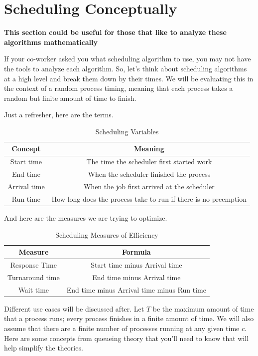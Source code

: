 \section{Scheduling Conceptually}\label{sec:scheduling_conceptually}

\textbf{This section could be useful for those that like to analyze these algorithms mathematically}

If your co-worker asked you what scheduling algorithm to use, you may not have the tools to analyze each algorithm.
So, let's think about scheduling algorithms at a high level and break them down by their times.
We will be evaluating this in the context of a random process timing, meaning that each process takes a random but finite amount of time to finish.

Just a refresher, here are the terms.

\begin{table}[h]
  \centering
\caption{Scheduling Variables}
\begin{tabular}{|c|c|}
  Concept & Meaning \\ \hline
  Start time & The time the scheduler first started work \\
  End time & When the scheduler finished the process \\
  Arrival time & When the job first arrived at the scheduler \\
  Run time & How long does the process take to run if there is no preemption
\end{tabular}
\end{table}

And here are the measures we are trying to optimize.

\begin{table}[h]
  \centering
\caption{Scheduling Measures of Efficiency}
\begin{tabular}{|c|c|}
  Measure & Formula \\ \hline
  Response Time & Start time minus Arrival time\\
  Turnaround time & End time minus Arrival time\\
  Wait time & End time minus Arrival time minus Run time \\
\end{tabular}
\end{table}

Different use cases will be discussed after.
Let $T$ be the maximum amount of time that a process runs; every process finishes in a finite amount of time.
We will also assume that there are a finite number of processes running at any given time $c$.
Here are some concepts from queueing theory that you'll need to know that will help simplify the theories.

